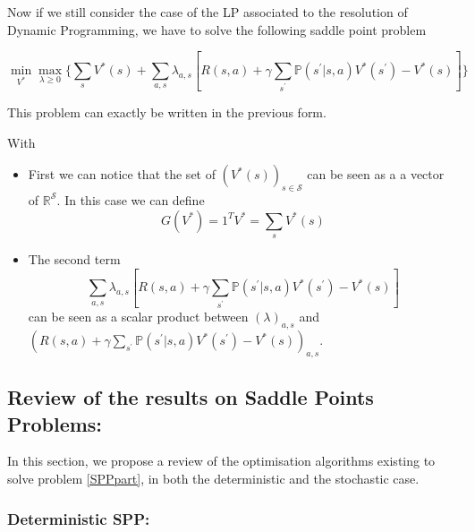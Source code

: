 \documentclass[12pt,reqno]{amsart}
\numberwithin{equation}{section}
\begin{document}
Now if we still consider the case of the LP associated to the resolution of Dynamic Programming,
we have to solve the following saddle point problem

$$
\min_{V^{*}}\max_{\lambda \geq 0}\{ \sum_{s} V^{*}(s) + \sum_{a,s}\lambda_{a,s}[R(s,a) + \gamma \sum_{s^{'}}\mathbb{P}(s^{'}| s,a )V^{*}(s^{'}) - V^{*}(s)] \}
$$

This problem can exactly be written in the previous form.


With 

\begin{itemize}
\item First we can notice that the set of $(V^{*}(s))_{s \in \mathcal{S}}$ 
can be seen as a a vector of $\mathbb{R}^{\mathcal{S}}$. In this case we can define
$$G(V^{*}) = 1^{T}V^{*} = \sum_{s} V^{*}(s)$$
\item The second term 
$$
\sum_{a,s}\lambda_{a,s}[R(s,a) + \gamma \sum_{s^{'}}\mathbb{P}(s^{'}| s,a )V^{*}(s^{'}) - V^{*}(s)]
$$
can be seen as a scalar product between $(\lambda)_{a,s}$ and $(R(s,a) + \gamma \sum_{s^{'}}\mathbb{P}(s^{'}| s,a )V^{*}(s^{'}) - V^{*}(s))_{a,s}$.

\end{itemize}

\subsection{ Review of the results on Saddle Points Problems: }


In this section, we propose a review of the optimisation algorithms existing to solve problem \ref{SPPpart}, in both the deterministic and the stochastic case.

\subsubsection{Deterministic SPP: }
\end{document}
